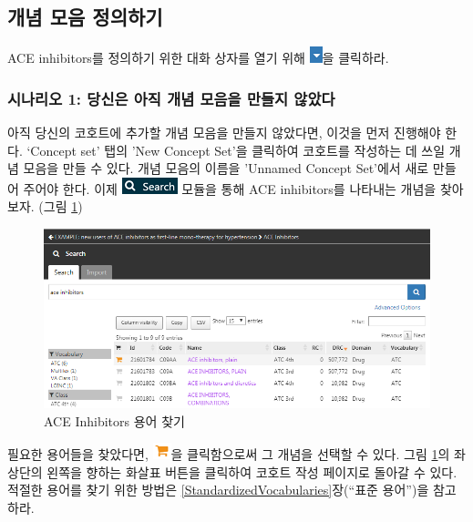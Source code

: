 \documentclass[11pt]{book}
\theoremstyle{definition}
\theoremstyle{definition}
\theoremstyle{definition}
\theoremstyle{remark}
\begin{document}
\subsection{개념 모음 정의하기}\label{--}

ACE inhibitors를 정의하기 위한 대화 상자를 열기 위해
\includegraphics{images/Cohorts/downarrow.png}을 클릭하라.

\subsubsection*{시나리오 1: 당신은 아직 개념 모음을 만들지
않았다}\label{-1------}

아직 당신의 코호트에 추가할 개념 모음을 만들지 않았다면, 이것을 먼저
진행해야 한다. `Concept set' 탭의 'New Concept Set'을 클릭하여 코호트를
작성하는 데 쓰일 개념 모음을 만들 수 있다. 개념 모음의 이름을 'Unnamed
Concept Set'에서 새로 만들어 주어야 한다. 이제
\includegraphics{images/Cohorts/search-2.png} 모듈을 통해 ACE
inhibitors를 나타내는 개념을 찾아보자. (그림 \ref{fig:aceinhibitors})

\begin{figure}

{\centering \includegraphics[width=1\linewidth]{images/Cohorts/aceinhibitors} 

}

\caption{ACE Inhibitors 용어 찾기}\label{fig:aceinhibitors}
\end{figure}

필요한 용어들을 찾았다면,
\includegraphics{images/Cohorts/shoppingcart.png}을 클릭함으로써 그
개념을 선택할 수 있다. 그림 \ref{fig:aceinhibitors}의 좌상단의 왼쪽을
향하는 화살표 버튼을 클릭하여 코호트 작성 페이지로 돌아갈 수 있다.
적절한 용어를 찾기 위한 방법은 \ref{StandardizedVocabularies}장(``표준
용어'')을 참고하라.
\end{document}
